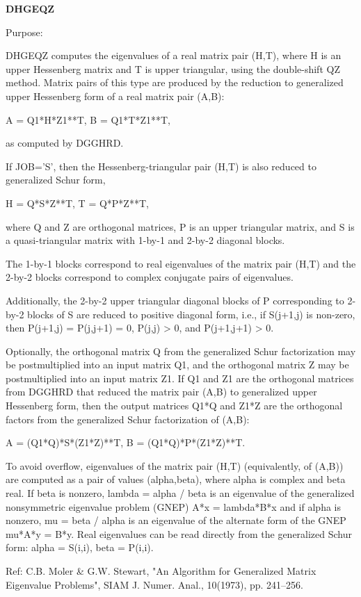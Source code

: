 {\bfseries D\+H\+G\+E\+Q\+Z} 

 \begin{DoxyParagraph}{Purpose\+: }
\begin{DoxyVerb} DHGEQZ computes the eigenvalues of a real matrix pair (H,T),
 where H is an upper Hessenberg matrix and T is upper triangular,
 using the double-shift QZ method.
 Matrix pairs of this type are produced by the reduction to
 generalized upper Hessenberg form of a real matrix pair (A,B):

    A = Q1*H*Z1**T,  B = Q1*T*Z1**T,

 as computed by DGGHRD.

 If JOB='S', then the Hessenberg-triangular pair (H,T) is
 also reduced to generalized Schur form,
 
    H = Q*S*Z**T,  T = Q*P*Z**T,
 
 where Q and Z are orthogonal matrices, P is an upper triangular
 matrix, and S is a quasi-triangular matrix with 1-by-1 and 2-by-2
 diagonal blocks.

 The 1-by-1 blocks correspond to real eigenvalues of the matrix pair
 (H,T) and the 2-by-2 blocks correspond to complex conjugate pairs of
 eigenvalues.

 Additionally, the 2-by-2 upper triangular diagonal blocks of P
 corresponding to 2-by-2 blocks of S are reduced to positive diagonal
 form, i.e., if S(j+1,j) is non-zero, then P(j+1,j) = P(j,j+1) = 0,
 P(j,j) > 0, and P(j+1,j+1) > 0.

 Optionally, the orthogonal matrix Q from the generalized Schur
 factorization may be postmultiplied into an input matrix Q1, and the
 orthogonal matrix Z may be postmultiplied into an input matrix Z1.
 If Q1 and Z1 are the orthogonal matrices from DGGHRD that reduced
 the matrix pair (A,B) to generalized upper Hessenberg form, then the
 output matrices Q1*Q and Z1*Z are the orthogonal factors from the
 generalized Schur factorization of (A,B):

    A = (Q1*Q)*S*(Z1*Z)**T,  B = (Q1*Q)*P*(Z1*Z)**T.
 
 To avoid overflow, eigenvalues of the matrix pair (H,T) (equivalently,
 of (A,B)) are computed as a pair of values (alpha,beta), where alpha is
 complex and beta real.
 If beta is nonzero, lambda = alpha / beta is an eigenvalue of the
 generalized nonsymmetric eigenvalue problem (GNEP)
    A*x = lambda*B*x
 and if alpha is nonzero, mu = beta / alpha is an eigenvalue of the
 alternate form of the GNEP
    mu*A*y = B*y.
 Real eigenvalues can be read directly from the generalized Schur
 form: 
   alpha = S(i,i), beta = P(i,i).

 Ref: C.B. Moler & G.W. Stewart, "An Algorithm for Generalized Matrix
      Eigenvalue Problems", SIAM J. Numer. Anal., 10(1973),
      pp. 241--256.\end{DoxyVerb}
 
\end{DoxyParagraph}

